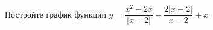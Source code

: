 \begin{ex}
	\begin{condition}
		Постройте график функции \( y=\dfrac{x^2-2x}{|x-2|}-\dfrac{2|x-2|}{x-2}+x \)
	\end{condition}
\end{ex}